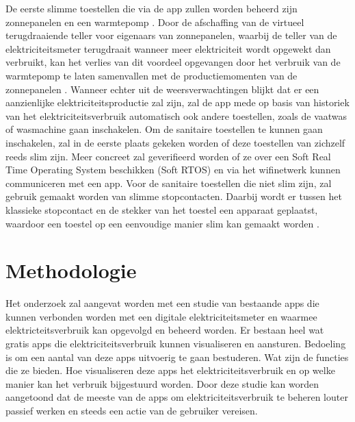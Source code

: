 \documentclass{hogent-article}
\begin{document}
De eerste slimme toestellen die via de app zullen worden beheerd zijn zonnepanelen en een warmtepomp \autocite{Uytterhoeven2019}. Door de afschaffing van de virtueel terugdraaiende teller voor eigenaars van zonnepanelen, waarbij de teller van de elektriciteitsmeter terugdraait wanneer meer elektriciteit wordt opgewekt dan verbruikt, kan het verlies van dit voordeel opgevangen door het verbruik van de warmtepomp te laten samenvallen met de productiemomenten van de zonnepanelen \autocite{Selleslagh2021}. Wanneer echter uit de weersverwachtingen blijkt dat er een aanzienlijke elektriciteitsproductie zal zijn, zal de app  mede op basis van historiek van het elektriciteitsverbruik automatisch ook andere toestellen, zoals de vaatwas of wasmachine gaan inschakelen. Om de sanitaire toestellen te kunnen gaan inschakelen, zal in de eerste plaats gekeken worden of deze toestellen van zichzelf reeds slim zijn. Meer concreet zal geverifieerd worden of ze over een Soft Real Time Operating System beschikken (Soft RTOS) en via het wifinetwerk kunnen communiceren met een app. Voor de sanitaire toestellen die niet slim zijn, zal gebruik gemaakt worden van slimme stopcontacten. Daarbij wordt er tussen het klassieke stopcontact en de stekker van het toestel een apparaat geplaatst, waardoor een toestel op een eenvoudige manier slim kan gemaakt worden \autocite{Jong2020}.

\newpage \pagebreak \cleardoublepage
\section{Methodologie}%
\label{sec:methodologie}

Het onderzoek zal aangevat worden met een studie van bestaande apps die kunnen verbonden worden met een digitale elektriciteitsmeter en waarmee elektricteitsverbruik kan opgevolgd en beheerd worden. Er bestaan heel wat gratis apps die elektriciteitsverbruik kunnen visualiseren en aansturen. Bedoeling is om een aantal van deze apps uitvoerig te gaan bestuderen. Wat zijn de functies die ze bieden. Hoe visualiseren deze apps het elektriciteitsverbruik en op welke manier kan het verbruik bijgestuurd worden. Door deze studie kan worden aangetoond dat de meeste van de apps om elektriciteitsverbruik te beheren louter passief werken en steeds een actie van de gebruiker vereisen.
\end{document}

